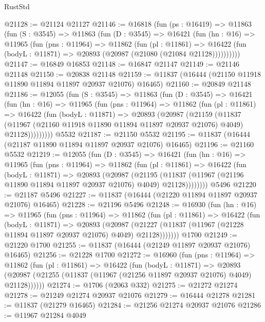 \begin{lexlean}{RustStd}
\begin{coremodule}
{\begin{coremodule}
{{{{{{{{{{{{{{{{{{{{{{{{{{{{{{{{{{{{{{{{{{{{{{{{{{@21128 := @21124 @21127
@21146 := @16818
    (fun (ps : @16419) =>
    @11863
      (fun (S : @3545) =>
      @11863
        (fun (D : @3545) =>
        @16421
          (fun (hn : @16) =>
          @11965
            (fun (pns : @11964) =>
            @11862
              (fun (pl : @11861) =>
              @16422 (fun (bodyL : @11871) => @20893 (@20987 (@21080 (@21084 @21128))))))))))
@21147 := @16849 @16853
@21148 := @16847 @21147
@21149 := @21146 @21148
@21150 := @20838 @21148
@21159 := @11837 (@16444 (@21150 @11918 @11890 @11894 @11897 @20937 @21076) @16465)
@21160 := @20849 @21148
@21186 := @12055
    (fun (S : @3545) =>
    @11863
      (fun (D : @3545) =>
      @16421
        (fun (hn : @16) =>
        @11965
          (fun (pns : @11964) =>
          @11862
            (fun (pl : @11861) =>
            @16422
              (fun (bodyL : @11871) =>
              @20893
                (@20987
                  (@21159
                    (@11837
                      (@11967 (@21160 @11918 @11890 @11894 @11897 @20937 @21076) @4049)
                      @21128)))))))))
    @5532
@21187 := @21150 @5532
@21195 := @11837 (@16444 (@21187 @11890 @11894 @11897 @20937 @21076) @16465)
@21196 := @21160 @5532
@21219 := @12055
    (fun (D : @3545) =>
    @16421
      (fun (hn : @16) =>
      @11965
        (fun (pns : @11964) =>
        @11862
          (fun (pl : @11861) =>
          @16422
            (fun (bodyL : @11871) =>
            @20893
              (@20987
                (@21195
                  (@11837 (@11967 (@21196 @11890 @11894 @11897 @20937 @21076) @4049) @21128))))))))
    @5496
@21220 := @21187 @5496
@21227 := @11837 (@16444 (@21220 @11894 @11897 @20937 @21076) @16465)
@21228 := @21196 @5496
@21248 := @16930
    (fun (hn : @16) =>
    @11965
      (fun (pns : @11964) =>
      @11862
        (fun (pl : @11861) =>
        @16422
          (fun (bodyL : @11871) =>
          @20893
            (@20987
              (@21227 (@11837 (@11967 (@21228 @11894 @11897 @20937 @21076) @4049) @21128)))))))
    @1700
@21249 := @21220 @1700
@21255 := @11837 (@16444 (@21249 @11897 @20937 @21076) @16465)
@21256 := @21228 @1700
@21272 := @16960
    (fun (pns : @11964) =>
    @11862
      (fun (pl : @11861) =>
      @16422
        (fun (bodyL : @11871) =>
        @20893 (@20987 (@21255 (@11837 (@11967 (@21256 @11897 @20937 @21076) @4049) @21128))))))
@21274 := @1706 (@2063 @332)
@21275 := @21272 @21274
@21278 := @21249 @21274 @20937 @21076
@21279 := @16444 @21278
@21281 := @11837 (@21279 @16465)
@21284 := @21256 @21274 @20937 @21076
@21286 := @11967 @21284 @4049
}}}}}}}}}}}}}}}}}}}}}}}}}}}}}}}}}}}}}}}}}}}}}}}}}}
\end{coremodule}}
\end{coremodule}
\end{lexlean}
